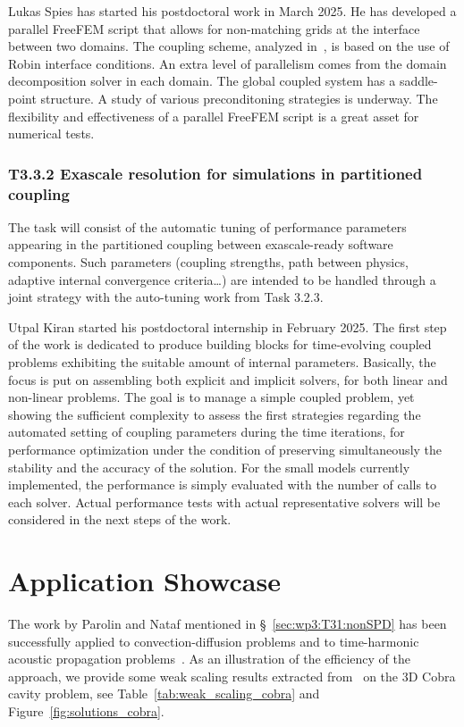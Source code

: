   Lukas Spies has started his postdoctoral work in March 2025. He has developed a parallel FreeFEM script that allows for non-matching grids at the interface between two domains. The coupling scheme, analyzed in~\cite{japhet_robin_2014}, is based on the use of Robin interface conditions. An extra level of parallelism comes from the domain decomposition solver in each domain. The global coupled system has a saddle-point structure. A study of various preconditoning strategies is underway. The flexibility and effectiveness of a parallel FreeFEM script is a great asset for numerical tests. 


\subsubsection{ 
T3.3.2 Exascale resolution for simulations in partitioned coupling
}
\label{sec:wp3:T332}
 The task will consist of the automatic tuning of performance parameters appearing in the partitioned coupling between exascale-ready software components. Such parameters (coupling strengths, path between physics, adaptive internal convergence criteria…) are intended to be handled through a joint strategy with the auto-tuning work from Task 3.2.3. 

Utpal Kiran started his postdoctoral internship in February 2025. The first step of the work is dedicated to produce building blocks for time-evolving coupled problems exhibiting the suitable amount of internal parameters. Basically, the focus is put on assembling both explicit and implicit solvers, for both linear and non-linear problems. The goal is to manage a simple coupled problem, yet showing the sufficient complexity to assess the first strategies regarding the automated setting of coupling parameters during the time iterations, for performance optimization under the condition of preserving simultaneously the stability and the accuracy of the solution. For the small models currently implemented, the performance is simply evaluated with the number of calls to each solver. Actual performance tests with actual representative solvers will be considered in the next steps of the work.



\section{Application Showcase}
%   
The work by Parolin and Nataf mentioned in \S~\ref{sec:wp3:T31:nonSPD} has been successfully applied to convection-diffusion problems and to time-harmonic acoustic propagation problems~\cite{dolean:hal-05241475}. As an illustration of the efficiency of the approach, we provide some weak scaling results extracted from~\cite{dolean:hal-05241475} on the 3D Cobra cavity problem, see Table~\ref{tab:weak_scaling_cobra} and Figure~\ref{fig:solutions_cobra}. 

